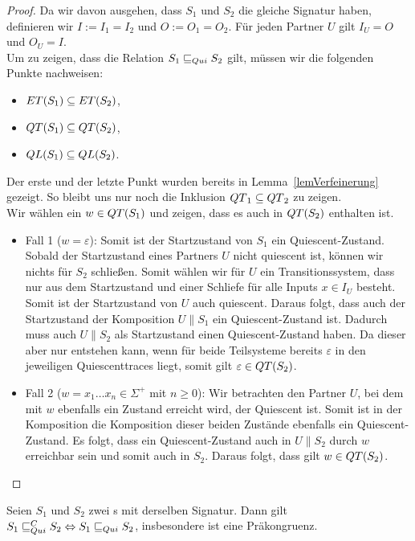 \begin{proof}
  Da wir davon ausgehen, dass $S_1$ und $S_2$ die gleiche Signatur haben,
  definieren wir $I:=I_1=I_2$ und $O:=O_1=O_2$. Für jeden Partner $U$ gilt
  $I_U=O$ und $O_U=I$.\\
  Um zu zeigen, dass die Relation $S_1\sqsubseteq _{Qui} S_2$ gilt, müssen wir die
  folgenden Punkte nachweisen:
  \begin{itemize}
    \item $ET{}(S_1)\subseteq ET{}(S_2)$,
    \item $QT{}(S_1)\subseteq QT{}(S_2)$,
    \item $QL{}(S_1)\subseteq QL{}(S_2)$.
  \end{itemize}
  Der erste und der letzte Punkt wurden bereits in Lemma~\ref{lemVerfeinerung}
  gezeigt. So bleibt uns nur noch die Inklusion $QT{}_1\subseteq QT{}_2$ zu
  zeigen.\\
  Wir wählen ein $w\in QT{}(S_1)$ und zeigen, dass es auch in $QT{}(S_2)$
  enthalten ist.
  \begin{itemize}
    \item Fall 1 ($w=\varepsilon$): Somit ist der Startzustand von $S_1$ ein
      Quiescent-Zustand. Sobald der Startzustand eines Partners $U$ nicht
      quiescent ist, können wir nichts für $S_2$ schließen. Somit wählen wir
      für $U$ ein Transitionssystem, dass nur aus dem Startzustand und einer
      Schliefe für alle Inputs $x\in I_U$ besteht. Somit ist der Startzustand
      von $U$ auch quiescent. Daraus folgt, dass auch der Startzustand der
      Komposition $U\|S_1$ ein Quiescent-Zustand ist. Dadurch muss auch
      $U\|S_2$ als Startzustand einen Quiescent-Zustand haben. Da dieser aber
      nur entstehen kann, wenn für beide Teilsysteme bereits $\varepsilon$ in
      den jeweiligen Quiescenttraces liegt, somit gilt $\varepsilon\in
      QT{}(S_2)$.
    \item Fall 2 ($w=x_1\dots x_n\in\Sigma ^+$ mit $n\geq 0$): Wir betrachten
      den Partner $U$, bei dem mit $w$ ebenfalls ein Zustand erreicht wird, der
      Quiescent ist. Somit ist in der Komposition die Komposition dieser
      beiden Zustände ebenfalls ein Quiescent-Zustand. Es folgt, dass ein
      Quiescent-Zustand auch in $U\|S_2$ durch $w$ erreichbar sein und somit
    auch in $S_2$. Daraus folgt, dass gilt $w\in QT{}(S_2)$.
  \end{itemize}
\end{proof}

\begin{satz}
  \label{satzQuiFullAbst}
  Seien $S_1$ und $S_2$ zwei \EIO{}s mit derselben Signatur. Dann gilt
  $S_1\sqsubseteq _{Qui}^C S_2\Leftrightarrow S_1\sqsubseteq _{Qui} S_2$, insbesondere ist \QRel{} eine
  Präkongruenz.
\end{satz}

